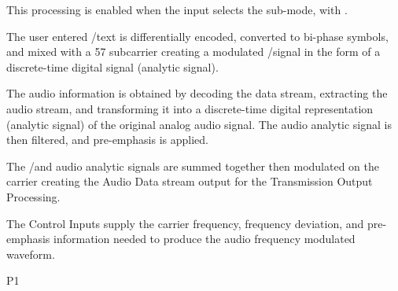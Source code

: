 {
	\item This processing is enabled when the input selects the sub-mode, \FM with \RDS.
	\item The user entered \RDS/\RBDS text is differentially encoded, converted to bi-phase symbols, and mixed with a 57 \KHz subcarrier creating a \DSBSC modulated \RDS/\RBDS signal in the form of a discrete-time digital signal (analytic signal).
	\item The audio information is obtained by decoding the \MPEGTS data stream, extracting the audio stream, and transforming it into a discrete-time digital representation (analytic signal) of the original analog audio signal. The audio analytic signal is then filtered, and pre-emphasis is applied.
	\item The \RDS/\RBDS and audio analytic signals are summed together then \FM modulated on the \RF carrier creating the Audio Data stream output for the Transmission Output Processing.
	\item The Control Inputs supply the \RF carrier frequency, frequency deviation, and pre-emphasis information needed to produce the audio frequency modulated \RF waveform.
}
{P1}



